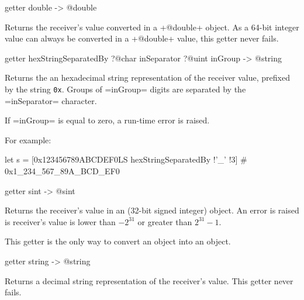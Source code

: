 \begin{galgas3}
getter double -> @double
\end{galgas3}

Returns the receiver's value converted in a \ggst+@double+ object. As a 64-bit integer value can always be converted in a \ggst+@double+ value, this getter never fails.




\begin{galgas3}
getter hexStringSeparatedBy ?@char inSeparator ?@uint inGroup -> @string
\end{galgas3}

Returns the an hexadecimal string representation of the receiver value, prefixed by the string \texttt{0x}. Groups of \ggst=inGroup= digits are separated by the \ggst=inSeparator= character.

If \ggst=inGroup= is equal to zero, a run-time error is raised.

For example:
\begin{galgas3}
let s = [0x123456789ABCDEF0LS hexStringSeparatedBy !'_' !3] # 0x1_234_567_89A_BCD_EF0
\end{galgas3}





\begin{galgas3}
getter sint -> @sint
\end{galgas3}

Returns the receiver's value in an  (32-bit signed integer) object. An error is raised is receiver's value is lower than $-2^{31}$ or greater than $2^{31}-1$.

This getter is the only way to convert an  object into an  object.






\begin{galgas3}
getter string -> @string
\end{galgas3}

Returns a decimal string representation of the receiver's value. This getter never fails.









